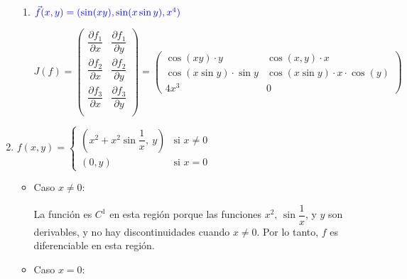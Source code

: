 \begin{enumerate}[label=\c olor{red}\textbf{\arabic*)}, leftmargin=*]
\begin{enumerate}[label=\color{red}\textbf{\alph*)}]
	\item $\textcolor{blue}{\vec{f}(x,y)=(\sin(xy), \sin(x\sin y), x^{4})}$
	
	$J(f)=\begin{pmatrix}
	\dfrac{\partial f_1}{\partial x} & \dfrac{\partial f_1}{\partial y}\\
	\dfrac{\partial f_2}{\partial x} & \dfrac{\partial f_2}{\partial y}\\
	\dfrac{\partial f_3}{\partial x} & \dfrac{\partial f_3}{\partial y}\\
	\end{pmatrix}=\begin{pmatrix}
	\cos(xy)\cdot y & \cos(x,y)\cdot x\\
	\cos(x\sin y)\cdot\sin y & \cos(x\sin y)\cdot x\cdot\cos(y)\\
	4x^{3} & 0
	\end{pmatrix}$
\end{enumerate}

\item {}

$f(x,y)=\begin{cases}
\left(x^{2}+x^{2}\sin\dfrac{1}{x},\:y\right) & \text{si }x\neq0\\
(0,y) & \text{si }x=0
\end{cases}$
\begin{itemize}
\item Caso $x\neq0$:

La función es $C^{1}$ en esta región porque las funciones $x^{2},\,\sin\dfrac{1}{x}$, y $y$ son derivables, y no hay discontinuidades cuando $x\neq0$. Por lo tanto, $f$ es diferenciable en esta región.

\item Caso $x=0$:


\end{itemize}
\end{enumerate}
